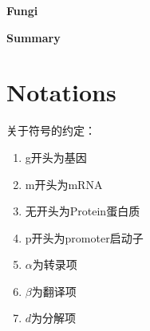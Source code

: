 \documentclass[12pt]{article}
\begin{document}
\graphicspath{{.}}  %
\thispagestyle{empty}



\vspace{20pt}
\centerline{{\Large \textbf{Fungi}}}
\vspace{15pt}

\centerline{{\large \textbf{Summary}}}
\vspace{7pt}






\newpage
\thispagestyle{empty}
\setcounter{page}{0}
\tableofcontents                                                  %
\newpage                                                          %
\section{Notations}
关于符号的约定：
\begin{enumerate}
    \item g开头为基因
    \item m开头为mRNA
    \item 无开头为Protein蛋白质
    \item p开头为promoter启动子
    \item $\alpha$为转录项
    \item $\beta$为翻译项
    \item $d$为分解项
\end{enumerate}
\end{document}

